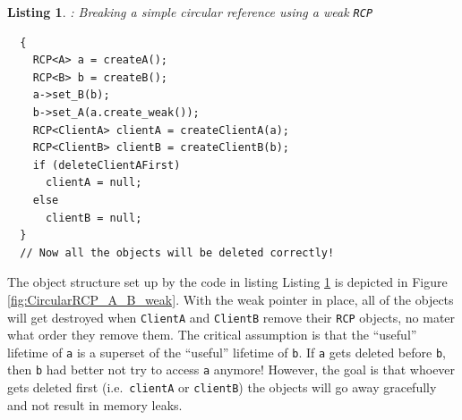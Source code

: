 \documentclass[pdf,ps2pdf,11pt]{SANDreport}
\newtheorem{listing}{Listing}
\begin{document}
\begin{listing}: Breaking a simple circular reference using a weak
{}\texttt{RCP} \\
\label{listing:CircularRCP_A_B_weak}
{\small\begin{verbatim}
  {
    RCP<A> a = createA();
    RCP<B> b = createB();
    a->set_B(b);
    b->set_A(a.create_weak());
    RCP<ClientA> clientA = createClientA(a);
    RCP<ClientB> clientB = createClientB(b);
    if (deleteClientAFirst)
      clientA = null;
    else
      clientB = null;
  }
  // Now all the objects will be deleted correctly!
\end{verbatim}}
\end{listing}


The object structure set up by the code in listing Listing
{}\ref{listing:CircularRCP_A_B_weak} is depicted in Figure
{}\ref{fig:CircularRCP_A_B_weak}.  With the weak pointer in place, all
of the objects will get destroyed when {}\texttt{ClientA} and
{}\texttt{ClientB} remove their {}\texttt{RCP} objects, no mater what
order they remove them.  The critical assumption is that the
``useful'' lifetime of {}\texttt{a} is a superset of the ``useful''
lifetime of {}\texttt{b}.  If {}\texttt{a} gets deleted before
{}\texttt{b}, then {}\texttt{b} had better not try to access
{}\texttt{a} anymore!  However, the goal is that whoever gets deleted
first (i.e.\ {}\texttt{clientA} or {}\texttt{clientB}) the objects
will go away gracefully and not result in memory leaks.
\end{document}
